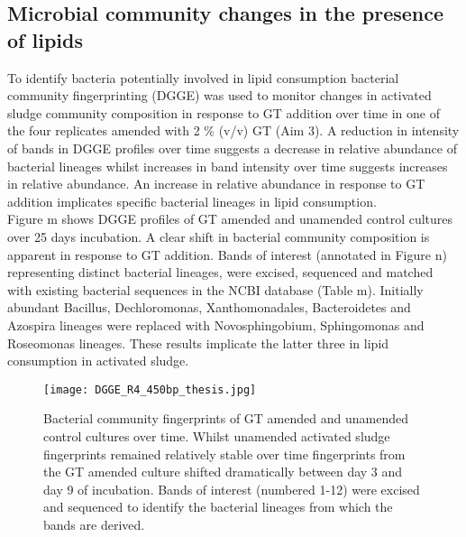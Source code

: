 \documentclass[11pt]{article}
\begin{document}
\subsection{Microbial community changes in the presence of lipids}
To identify bacteria potentially involved in lipid consumption bacterial community fingerprinting (DGGE) was used to monitor changes in activated sludge community composition in response to GT addition over time in one of the four replicates amended with 2 \% (v/v) GT (Aim 3). A reduction in intensity of bands in DGGE profiles over time suggests a decrease in relative abundance of bacterial lineages whilst increases in band intensity over time suggests increases in relative abundance. An increase in relative abundance in response to GT addition implicates specific bacterial lineages in lipid consumption.\\

Figure m shows DGGE profiles of GT amended and unamended control cultures over 25 days incubation. A clear shift in bacterial community composition is apparent in response to GT addition. Bands of interest (annotated in Figure n) representing distinct bacterial lineages, were excised, sequenced and matched with existing bacterial sequences in the NCBI database (Table m). Initially abundant Bacillus, Dechloromonas, Xanthomonadales, Bacteroidetes and Azospira lineages were replaced with Novosphingobium, Sphingomonas and Roseomonas lineages. These results implicate the latter three in lipid consumption in activated sludge.\\

\begin{figure}
\texttt{[image: DGGE\_R4\_450bp\_thesis.jpg]}
\caption{Bacterial community fingerprints of GT amended and unamended control cultures over time. Whilst unamended activated sludge fingerprints remained relatively stable over time fingerprints from the GT amended culture shifted dramatically between day 3 and day 9 of incubation. Bands of interest (numbered 1-12) were excised and sequenced to identify the bacterial lineages from which the bands are derived.}
\end{figure}
\end{document}

